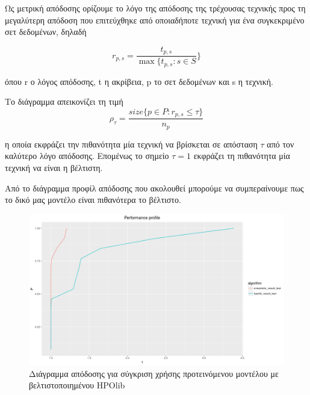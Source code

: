 \documentclass[]{article}
\numberwithin{equation}{section}		%
\numberwithin{figure}{section}			%
\numberwithin{table}{section}				%
\begin{document}
    Ως μετρική απόδοσης ορίζουμε το λόγο της απόδοσης της τρέχουσας τεχνικής προς τη μεγαλύτερη απόδοση που επιτεύχθηκε από οποιαδήποτε τεχνική για ένα συγκεκριμένο σετ δεδομένων, δηλαδή
    
    \begin{equation}
    r_{p,s}= \frac{t_{p,s}}{\max\{{t_{p,s} : s \in S}}\}    
    \end{equation} 
    
    όπου r ο λόγος απόδοσης, t η ακρίβεια, p το σετ δεδομένων και s η τεχνική.
    
    Το διάγραμμα απεικονίζει τη τιμή
     \begin{equation}
     \rho_{\tau}= \frac{size\{{p \in P : r_{p,s} \leq \tau  }\}}{n_p}   
     \end{equation}
      
     η οποία εκφράζει την πιθανότητα μία τεχνική να βρίσκεται σε απόσταση $\tau$ από τον καλύτερο λόγο απόδοσης.  Επομένως το σημείο $\tau = 1$ εκφράζει τη πιθανότητα μία τεχνική να είναι η βέλτιστη.
      
   	Από το διάγραμμα προφίλ απόδοσης που ακολουθεί μπορούμε να συμπεραίνουμε πως το δικό μας μοντέλο είναι πιθανότερα το βέλτιστο. 
   	
   	\begin{figure}[H]
   		\centering
   		\includegraphics[width=\linewidth, height=0.3\textheight]{perf_prof}
   		\caption{Διάγραμμα απόδοσης για σύγκριση χρήσης προτεινόμενου μοντέλου με βελτιστοποιημένου HPOlib}
   		\label{fig:1}
   	\end{figure}%
   	
   	
    \printbibliography[title= Βιβλιογραφία]
    
    \printglossary[style=long]
\end{document}
